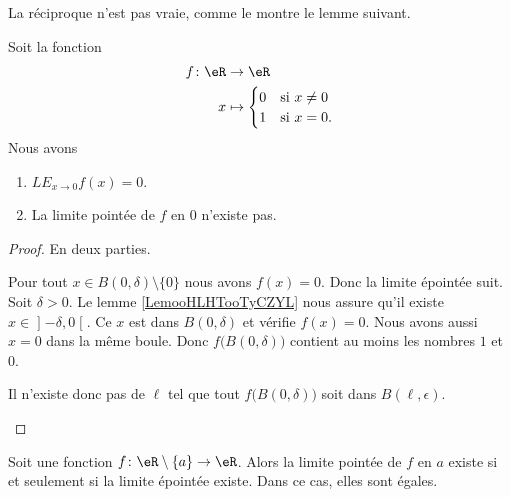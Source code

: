 La réciproque n'est pas vraie, comme le montre le lemme suivant.
\begin{lemma}     \label{LEMooOSNGooJpiXbK}
	Soit la fonction
	\begin{equation}
		\begin{aligned}
			f\colon \eR & \to \eR                        \\
			x           & \mapsto \begin{cases}
				                      0 & \text{si } x\neq 0 \\
				                      1 & \text{si }x=0.
			                      \end{cases}
		\end{aligned}
	\end{equation}
	Nous avons
	\begin{enumerate}
		\item       \label{ITEMooNRNCooFhbZwB}
		      \( {LE}_{x\to 0}f(x)=0\).
		\item       \label{ITEMooUSWMooMNPMCT}
		      La limite pointée de \( f\) en \( 0\) n'existe pas.
	\end{enumerate}
\end{lemma}

\begin{proof}
	En deux parties.
	\begin{subproof}
		Pour tout \( x\in B(0,\delta)\setminus\{ 0 \}\) nous avons \( f(x)=0\). Donc la limite épointée suit.
		Soit \( \delta>0\). Le lemme \ref{LemooHLHTooTyCZYL} nous assure qu'il existe \( x\in \mathopen] -\delta , 0 \mathclose[\). Ce \( x\) est dans \( B(0,\delta)\) et vérifie \( f(x)=0\). Nous avons aussi \( x=0\) dans la même boule. Donc \( f\big( B(0,\delta) \big)\) contient au moins les nombres \( 1\) et \( 0\).

		Il n'existe donc pas de \( \ell\) tel que tout \( f\big( B(0,\delta) \big)\) soit dans \( B(\ell, \epsilon)\).
	\end{subproof}
\end{proof}

\begin{lemma}\label{LEMooTPNEooRurTJJ}
	Soit une fonction \( f\colon \eR\setminus\{ a \}\to \eR\). Alors la limite pointée de \( f\) en \( a\) existe si et seulement si la limite épointée existe. Dans ce cas, elles sont égales.
\end{lemma}


